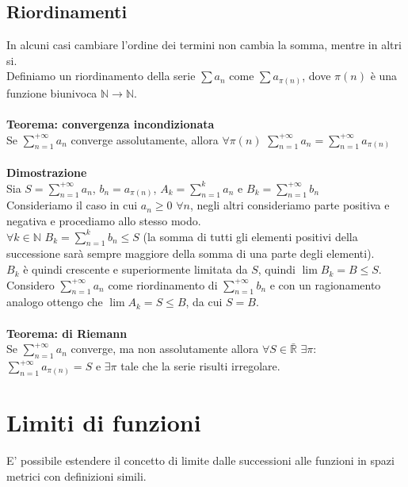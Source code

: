 \documentclass{article}
\begin{document}
\subsection{Riordinamenti}
In alcuni casi cambiare l'ordine dei termini non cambia la somma, mentre in altri si.\\
Definiamo un riordinamento della serie $\sum a_n$ come $\sum a_{\pi(n)}$, dove $\pi(n)$ è una funzione biunivoca $\mathds{N}\rightarrow\mathds{N}$.\\\\
\textbf{Teorema: convergenza incondizionata}\\
Se $\sum_{n=1}^{+\infty}a_n$ converge assolutamente, allora $\forall\pi(n)$ $\sum_{n=1}^{+\infty}a_n=\sum_{n=1}^{+\infty}a_{\pi(n)}$\\\\
\textbf{Dimostrazione}\\
Sia $S=\sum_{n=1}^{+\infty}a_n$, $b_n=a_{\pi(n)}$, $A_k=\sum_{n=1}^{k}a_n$ e $B_k=\sum_{n=1}^{+\infty}b_n$\\
Consideriamo il caso in cui $a_n\geq0$ $\forall n$, negli altri consideriamo parte positiva e negativa e procediamo allo stesso modo.\\
$\forall k\in\mathds{N}$ $B_k=\sum_{n=1}^{k}b_n\leq S$ (la somma di tutti gli elementi positivi della successione sarà sempre maggiore della somma di una parte degli elementi).\\
$B_k$ è quindi crescente e superiormente limitata da $S$, quindi $\lim B_k=B\leq S$.\\
Considero $\sum_{n=1}^{+\infty}a_n$ come riordinamento di $\sum_{n=1}^{+\infty}b_n$ e con un ragionamento analogo ottengo che $\lim A_k=S\leq B$, da cui $S=B$.\\
\\
\textbf{Teorema: di Riemann}\\
Se $\sum_{n=1}^{+\infty}a_n$ converge, ma non assolutamente allora $\forall S\in\bar{\mathds{R}}$ $\exists\pi:$ $\sum_{n=1}^{+\infty}a_{\pi(n)}=S$ e $\exists\pi$ tale che la serie risulti irregolare.

\section{Limiti di funzioni}

E' possibile estendere il concetto di limite dalle successioni alle funzioni in spazi metrici con definizioni simili.
\end{document}
